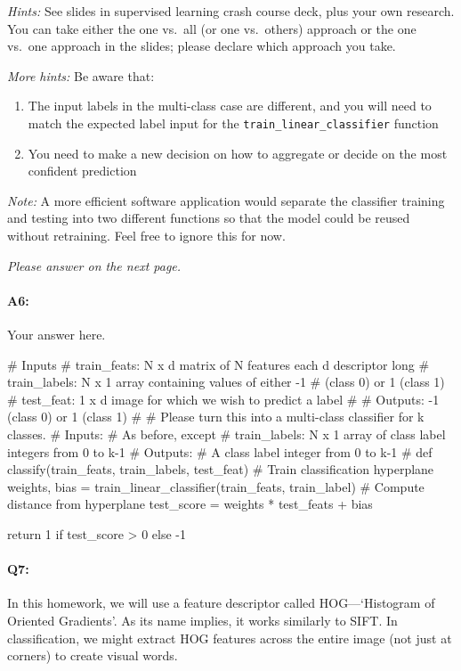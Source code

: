\emph{Hints:} See slides in supervised learning crash course deck, plus your own research. You can take either the one vs.~all (or one vs.~others) approach or the one vs.~one approach in the slides; please declare which approach you take.

\emph{More hints:} Be aware that:
\begin{enumerate}
    \item The input labels in the multi-class case are different, and you will need to match the expected label input for the \texttt{train\_linear\_classifier} function
    \item You need to make a new decision on how to aggregate or decide on the most confident prediction
\end{enumerate}

\emph{Note:} A more efficient software application would separate the classifier training and testing into two different functions so that the model could be reused without retraining. Feel free to ignore this for now.

\emph{Please answer on the next page.}

\pagebreak
\paragraph{A6:} Your answer here.

\begin{python}
# Inputs
#   train_feats: N x d matrix of N features each d descriptor long
#   train_labels: N x 1 array containing values of either -1 
#               (class 0) or 1 (class 1)
#   test_feat: 1 x d image for which we wish to predict a label
#
#   Outputs: -1 (class 0) or 1 (class 1)
#
# Please turn this into a multi-class classifier for k classes.
# Inputs:
#    As before, except
#    train_labels: N x 1 array of class label integers from 0 to k-1
# Outputs:
#    A class label integer from 0 to k-1
#
def classify(train_feats, train_labels, test_feat)
    # Train classification hyperplane
    weights, bias = train_linear_classifier(train_feats, train_label)
    # Compute distance from hyperplane
    test_score = weights * test_feats + bias

    return 1 if test_score > 0 else -1
\end{python}


\pagebreak

\paragraph{Q7:} In this homework, we will use a feature descriptor called HOG---`Histogram of Oriented Gradients'. As its name implies, it works similarly to SIFT. In classification, we might extract HOG features across the entire image (not just at corners) to create visual words.

